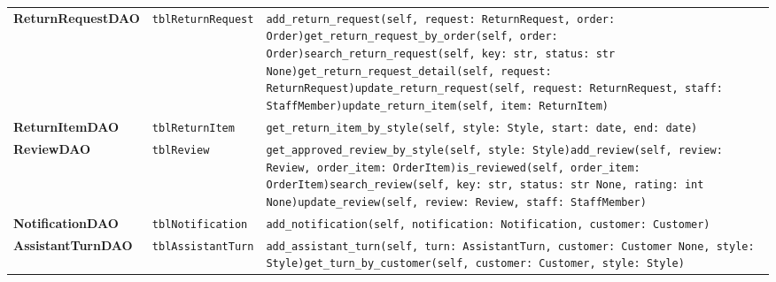{\begin{xltabular}{\textwidth}{@{}L{3.5cm} L{3.4cm} Y@{}}
\textbf{ReturnRequestDAO} & \texttt{tblReturnRequest} & \texttt{add\_\allowbreak{}return\_\allowbreak{}request(self,\allowbreak{} request: ReturnRequest,\allowbreak{} order: Order)}\newline \texttt{get\_\allowbreak{}return\_\allowbreak{}request\_\allowbreak{}by\_\allowbreak{}order(self,\allowbreak{} order: Order)}\newline \texttt{search\_\allowbreak{}return\_\allowbreak{}request(self,\allowbreak{} key: str,\allowbreak{} status: str \textbar{} None)}\newline \texttt{get\_\allowbreak{}return\_\allowbreak{}request\_\allowbreak{}detail(self,\allowbreak{} request: ReturnRequest)}\newline \texttt{update\_\allowbreak{}return\_\allowbreak{}request(self,\allowbreak{} request: ReturnRequest,\allowbreak{} staff: StaffMember)}\newline \texttt{update\_\allowbreak{}return\_\allowbreak{}item(self,\allowbreak{} item: ReturnItem)} \\
\textbf{ReturnItemDAO} & \texttt{tblReturnItem} & \texttt{get\_\allowbreak{}return\_\allowbreak{}item\_\allowbreak{}by\_\allowbreak{}style(self,\allowbreak{} style: Style,\allowbreak{} start: date,\allowbreak{} end: date)} \\
\textbf{ReviewDAO} & \texttt{tblReview} & \texttt{get\_\allowbreak{}approved\_\allowbreak{}review\_\allowbreak{}by\_\allowbreak{}style(self,\allowbreak{} style: Style)}\newline \texttt{add\_\allowbreak{}review(self,\allowbreak{} review: Review,\allowbreak{} order\_\allowbreak{}item: OrderItem)}\newline \texttt{is\_\allowbreak{}reviewed(self,\allowbreak{} order\_\allowbreak{}item: OrderItem)}\newline \texttt{search\_\allowbreak{}review(self,\allowbreak{} key: str,\allowbreak{} status: str \textbar{} None,\allowbreak{} rating: int \textbar{} None)}\newline \texttt{update\_\allowbreak{}review(self,\allowbreak{} review: Review,\allowbreak{} staff: StaffMember)} \\
\textbf{NotificationDAO} & \texttt{tblNotification} & \texttt{add\_\allowbreak{}notification(self,\allowbreak{} notification: Notification,\allowbreak{} customer: Customer)} \\
\textbf{AssistantTurnDAO} & \texttt{tblAssistantTurn} & \texttt{add\_\allowbreak{}assistant\_\allowbreak{}turn(self,\allowbreak{} turn: AssistantTurn,\allowbreak{} customer: Customer \textbar{} None,\allowbreak{} style: Style)}\newline \texttt{get\_\allowbreak{}turn\_\allowbreak{}by\_\allowbreak{}customer(self,\allowbreak{} customer: Customer,\allowbreak{} style: Style)} \\

\end{xltabular}}
